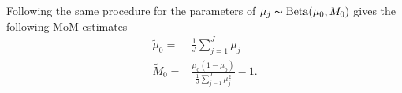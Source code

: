 \documentclass[11pt,reqno]{amsart}
\begin{document}
Following the same procedure for the parameters of $\mu_j \thicksim \text{Beta}(\mu_0, M_0)$ gives the following MoM estimates
\begin{eqnarray}
	\tilde{\mu}_0 =& \frac{1}{J} \sum_{j=1}^J \mu_j \\
	\tilde{M}_0 =& \frac{ \tilde{\mu}_0 (1 - \tilde{\mu}_0 ) } {\frac{1}{J} \sum_{j=1}^J \mu_j^2 } -1.
\end{eqnarray}



\end{document}
